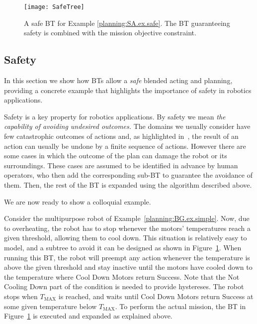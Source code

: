 \begin{figure}[b]
    \centering
\texttt{[image: SafeTree]}
    \caption{  A safe BT for Example \ref{planning:SA.ex.safe}. The BT guaranteeing safety is combined with the mission objective constraint.}
    \label{planning:SA.fig.tree}
\end{figure}

\subsection{Safety}
\label{planning:SA}
In this section we show how BTs allow  a \emph{safe} blended acting and planning, providing a concrete example that highlights the importance of safety in robotics applications.

Safety is a key property for robotics applications. By safety we mean \emph{the capability of avoiding undesired outcomes.} The domains we usually consider have few catastrophic outcomes of actions and,  as highlighted in~\cite{kaelbling2011hierarchical}, the result of an action can usually be undone by a finite sequence of actions. However there are some cases in which the outcome of the plan can damage the robot or its surroundings. 
These cases are assumed to be identified  in advance by human operators, who then add the corresponding sub-BT to guarantee the avoidance of them. Then, the rest of the BT is expanded using the algorithm described above.

We are now ready to show a colloquial example.
\begin{example}
\label{planning:SA.ex.safe}
Consider the multipurpose robot of Example~\ref{planning:BG.ex.simple}. Now, due to overheating, the robot has to stop whenever the motors' temperatures reach a given threshold, allowing them to cool down. This situation is relatively easy to model, and a subtree to avoid it can be designed as shown  in Figure~\ref{planning:SA.fig.tree}. When running this BT, the robot will preempt any action whenever the temperature is above the given threshold and stay inactive until the motors have cooled down to the temperature where Cool Down Motors return Success. Note that the Not Cooling Down part of the condition is needed to provide hystereses. The robot stops when $T_{\mbox{MAX}}$ is reached, and waits until Cool Down Motors return Success at some given temperature below $T_{\mbox{MAX}}$.
To perform the actual mission, the BT in Figure~\ref{planning:SA.fig.tree} is executed and expanded as explained above.
\end{example}

